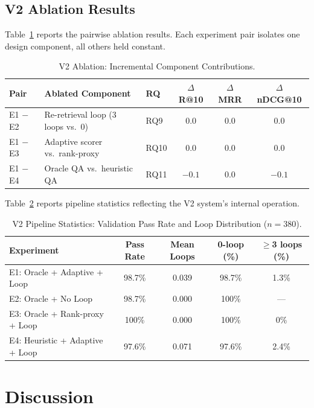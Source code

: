 \documentclass[11pt, a4paper]{article}
\begin{document}
\subsection{V2 Ablation Results}

Table~\ref{tab:ablation} reports the pairwise ablation results. Each experiment pair isolates one design component, all others held constant.

\begin{table}[htbp]
\centering
\caption{V2 Ablation: Incremental Component Contributions.}
\label{tab:ablation}
\begin{tabular}{lllccc}
\toprule
\textbf{Pair} & \textbf{Ablated Component} & \textbf{RQ} & \textbf{$\Delta$ R@10} & \textbf{$\Delta$ MRR} & \textbf{$\Delta$ nDCG@10} \\
\midrule
E1 $-$ E2 & Re-retrieval loop (3 loops vs.\ 0) & RQ9  & $0.0$ & $0.0$ & $0.0$ \\
E1 $-$ E3 & Adaptive scorer vs.\ rank-proxy    & RQ10 & $0.0$ & $0.0$ & $0.0$ \\
E1 $-$ E4 & Oracle QA vs.\ heuristic QA        & RQ11 & $-0.1$ & $0.0$ & $-0.1$ \\
\bottomrule
\end{tabular}
\end{table}

Table~\ref{tab:pipeline} reports pipeline statistics reflecting the V2 system's internal operation.

\begin{table}[htbp]
\centering
\caption{V2 Pipeline Statistics: Validation Pass Rate and Loop Distribution ($n{=}380$).}
\label{tab:pipeline}
\begin{tabular}{lcccc}
\toprule
\textbf{Experiment} & \textbf{Pass Rate} & \textbf{Mean Loops} & \textbf{0-loop (\%)} & \textbf{$\geq$3 loops (\%)} \\
\midrule
E1: Oracle + Adaptive + Loop    & 98.7\% & 0.039 & 98.7\% & 1.3\% \\
E2: Oracle + No Loop            & 98.7\% & 0.000 & 100\%  & ---  \\
E3: Oracle + Rank-proxy + Loop  & 100\%  & 0.000 & 100\%  & 0\%  \\
E4: Heuristic + Adaptive + Loop & 97.6\% & 0.071 & 97.6\% & 2.4\% \\
\bottomrule
\end{tabular}
\end{table}

\section{Discussion}
\label{sec:discussion}
\end{document}
